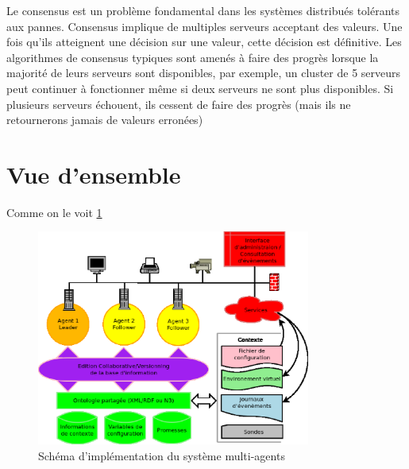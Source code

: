Le consensus est un problème fondamental dans les systèmes distribués tolérants
aux pannes. Consensus implique de multiples serveurs acceptant des valeurs. Une
fois qu'ils atteignent une décision sur une valeur, cette décision est
définitive. Les algorithmes de consensus typiques sont amenés à faire des
progrès lorsque la majorité de leurs serveurs sont disponibles, par exemple, un
cluster de 5 serveurs peut continuer à fonctionner même si deux serveurs ne sont
plus disponibles. Si plusieurs serveurs échouent, ils cessent de faire des
progrès (mais ils ne retournerons jamais de valeurs erronées)

\section{Vue d'ensemble}

Comme on le voit \ref{archi}

\begin{figure}[ht!]
  \centering
  \includegraphics[width=90mm]{img/archi}
  \caption{Schéma d'implémentation du système multi-agents}
  \label{archi}
\end{figure}


